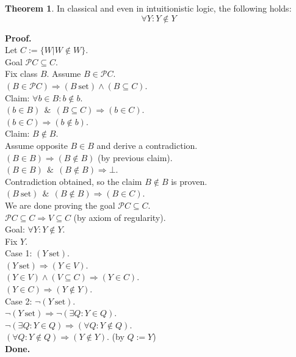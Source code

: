 \documentclass[10pt,a4paper]{article}
\theoremstyle{definition}
\newtheorem{theorem}{Theorem}[section]
\newcommand{\AND}{\ \ \&\ \ }
\newcommand{\Done}{\noindent \textbf{Done.}\\}
\newcommand{\power}{\mathcal{P}}
\newcommand{\Proof}{\noindent \textbf{Proof.}\\}
\newcommand{\set}{\mathrm{\ set}}
\begin{document}
\begin{theorem}
\label{thm:not in itself}
In classical and even in intuitionistic logic, the following holds:
\[ \forall Y: Y\notin Y\]
\end{theorem}
\Proof
\noindent %
Let $C:=\{W|W\notin W\}$.\\
Goal $\power C\subseteq C$.\\
Fix class $B$. Assume $B\in \power C$.\\
$(B\in \power C) \Longrightarrow (B\set)\land(B\subseteq C)$.\\
Claim: $\forall b\in B:b\notin b$.\\ %
$(b\in B)\AND(B\subseteq C) \Longrightarrow (b\in C)$.\\
$(b\in C) \Longrightarrow (b\notin b)$.\\
Claim: $B\notin B$.\\
Assume opposite $B\in B$ and derive a contradiction.\\
$(B\in B) \Longrightarrow (B\notin B)$ (by previous claim).\\
$(B\in B)\AND(B\notin B) \Longrightarrow \bot$.\\
Contradiction obtained, so the claim  $B\notin B$ is proven.\\
$(B\set)\AND(B\notin B) \Longrightarrow (B\in C)$.\\
We are done proving the goal $\power C\subseteq C$.\\
$\power C\subseteq C \Longrightarrow V\subseteq C$ (by axiom of regularity).\\
Goal: $ \forall Y: Y\notin Y$.\\
Fix $Y$.\\
Case 1: $(Y\set)$.\\
$(Y\set)\Longrightarrow (Y\in V)$.\\
$(Y\in V)\land (V\subseteq C) \Longrightarrow (Y\in C)$.\\
$(Y\in C)\Longrightarrow (Y\notin Y)$.\\
Case 2: $\neg(Y\set)$.\\
$\neg(Y\set) \Longrightarrow \neg(\exists Q:Y\in Q)$.\\
$\neg(\exists Q:Y\in Q)  \Longrightarrow (\forall Q:Y\notin Q)$.\\
$(\forall Q:Y\notin Q) \Longrightarrow (Y\notin Y)$. (by $Q:=Y$)\\
\Done
\end{document}
